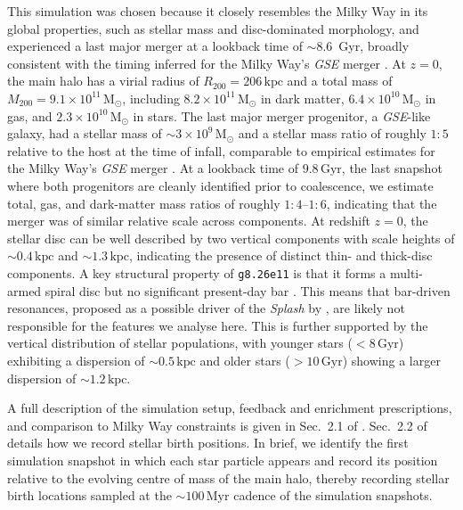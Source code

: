 \documentclass[fleqn,usenatbib]{mnras}
\begin{document}
This simulation was chosen because it closely resembles the Milky Way in its global properties, such as stellar mass and disc-dominated morphology, and experienced a last major merger at a lookback time of $\sim 8.6$~Gyr, broadly consistent with the timing inferred for the Milky Way's \textit{GSE} merger \citep{Helmi2018, Naidu2021}. At $z=0$, the main halo has a virial radius of $R_{200}=206\,\mathrm{kpc}$ and a total mass of $M_{200}=9.1\times10^{11}\,\mathrm{M_\odot}$, including $8.2\times10^{11}\,\mathrm{M_\odot}$ in dark matter, $6.4\times10^{10}\,\mathrm{M_\odot}$ in gas, and $2.3\times10^{10}\,\mathrm{M_\odot}$ in stars. The last major merger progenitor, a \textit{GSE}-like galaxy, had a stellar mass of $\sim 3\times10^9\,\mathrm{M_\odot}$ and a stellar mass ratio of roughly $1:5$ relative to the host at the time of infall, comparable to empirical estimates for the Milky Way's \textit{GSE} merger \citep[e.g.][]{Helmi2018, Naidu2021}. At a lookback time of $9.8\,\mathrm{Gyr}$, the last snapshot where both progenitors are cleanly identified prior to coalescence, we estimate total, gas, and dark-matter mass ratios of roughly $1:4$--$1:6$, indicating that the merger was of similar relative scale across components.
At redshift $z=0$, the stellar disc can be well described by two vertical components with scale heights of $\sim 0.4\,\mathrm{kpc}$ and $\sim 1.3\,\mathrm{kpc}$, indicating the presence of distinct thin- and thick-disc components.
A key structural property of \texttt{g8.26e11} is that it forms a multi-armed spiral disc but no significant present-day bar \citep{Buder2025}. This means that bar-driven resonances, proposed as a possible driver of the \textit{Splash} by \citet{Dillamore2022, Dillamore2023}, are likely not responsible for the features we analyse here. This is further supported by the vertical distribution of stellar populations, with younger stars ($<8\,\mathrm{Gyr}$) exhibiting a dispersion of $\sim 0.5\,\mathrm{kpc}$ and older stars ($>10\,\mathrm{Gyr}$) showing a larger dispersion of $\sim 1.2\,\mathrm{kpc}$.

A full description of the simulation setup, feedback and enrichment prescriptions, and comparison to Milky Way constraints is given in Sec.~2.1 of . Sec.~2.2 of  details how we record stellar birth positions. In brief, we identify the first simulation snapshot in which each star particle appears and record its position relative to the evolving centre of mass of the main halo, thereby recording stellar birth locations sampled at the $\sim100\,\mathrm{Myr}$ cadence of the simulation snapshots.
\end{document}
